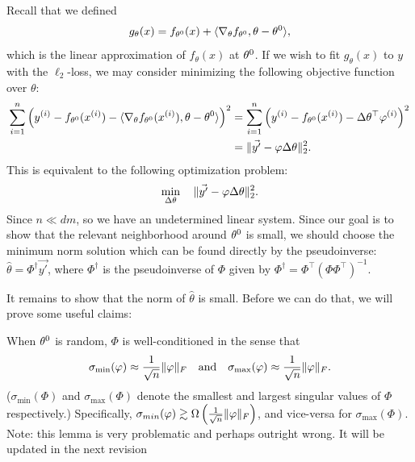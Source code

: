 Recall that we defined
\begin{align}
    g_\theta(x) = f_{\theta^{0}}(x) + \langle\nabla_\theta f_{\theta^{0}}, \theta - \theta^{0}\rangle,
\end{align}
which is the linear approximation of $f_\theta(x)$ at $\theta^{0}$. If we wish to fit $g_\theta(x)$ to $y$ with the $\ell_2$-loss, we may consider minimizing the following objective function over $\theta$:
\begin{align}
\sum_{i=1}^n \left( y^{(i)} - f_{\theta^{0}}(x^{(i)}) - \langle \nabla_\theta f_{\theta^{0}}(x^{(i)}), \theta - \theta^{0} \rangle \right)^2 
&=  \sum_{i=1}^n \left(y^{(i)} - f_{\theta^{0}}(x^{(i)}) - \Delta\theta^\top \varphi^{(i)} \right)^2 \\
&=  \|\vec{y'} - \varphi \Delta\theta\|_2^2.
\end{align}
This is equivalent to the following optimization problem:
\begin{align}
    \min_{\Delta \theta} \quad \|\vec{y'} - \varphi \Delta\theta\|_2^2. \label{lec12:eqn:opt-problem}
\end{align}
Since $n \ll dm$, so we have an undetermined linear system. Since our goal is to show that the relevant neighborhood around $\theta^{0}$ is small, we should choose the minimum norm solution which can be found directly by the pseudoinverse: $\hat{\theta} = \Phi^\dagger \vec{y'}$,  where $\Phi^\dagger$ is the pseudoinverse of $\Phi$ given by $\Phi^\dagger = \Phi^\top (\Phi \Phi^\top)^{-1}$.

It remains to show that the norm of $\hat{\theta}$ is small. Before we can do that, we will prove some useful claims:

\begin{lemma}\label{lec12:lem:claim1}
When $\theta^{0}$ is random, $\Phi$ is well-conditioned in the sense that \begin{align}
\sigma_{\min}(\varphi) \approx \frac{1}{\sqrt{n}} \|\varphi\|_F \quad \text{and} \quad
\sigma_{\max}(\varphi) \approx \frac{1}{\sqrt{n}} \|\varphi\|_F.
\end{align}
($\sigma_{\min}(\Phi)$ and $\sigma_{\max}(\Phi)$ denote the smallest and largest singular values of $\Phi$ respectively.) Specifically, $\sigma_{min}(\varphi) \gtrsim \Omega \left( \frac{1}{\sqrt{n}} \|\varphi\|_F \right)$, and vice-versa for $\sigma_{\max}(\Phi)$.
{\color{blue} Note: this lemma is very problematic and perhaps outright wrong. It will be updated in the next revision} 
\end{lemma}

